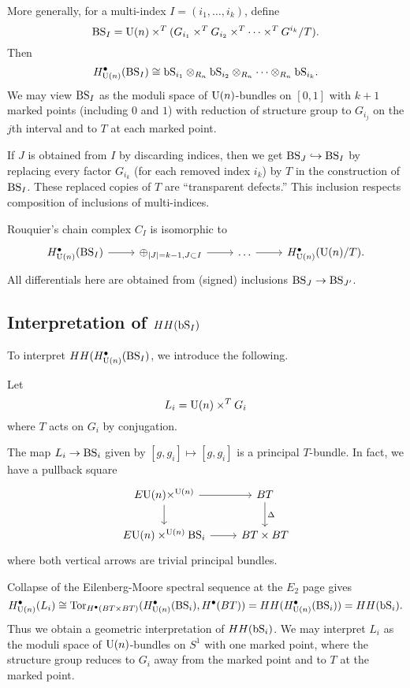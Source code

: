 More generally, for a multi-index $I = (i_1, \dots, i_k)$, define
\[
	\mathrm{BS}_I = \mathrm{U}(n) \times^T (G_{i_1} \times^T G_{i_2} \times^T \dots \times^T G^{i_k} / T).
\]
Then
\[
	H^\bullet_{\mathrm{U}(n)}(\mathrm{BS}_I) \cong \mathrm{bS}_{i_1} \otimes_{R_n} \mathrm{bS}_{i_2} \otimes_{R_n} \dots \otimes_{R_n} \mathrm{bS}_{i_k}.
\]
We may view $\mathrm{BS}_I$ as the moduli space of $\mathrm{U}(n)$-bundles on $[0, 1]$ with $k + 1$ marked points (including $0$ and $1$) with reduction of structure group to $G_{i_j}$ on the $j$th interval and to $T$ at each marked point.

If $J$ is obtained from $I$ by discarding indices, then we get $\mathrm{BS}_J \hookrightarrow \mathrm{BS}_I$ by replacing every factor $G_{i_k}$ (for each removed index $i_k$) by $T$ in the construction of $\mathrm{BS}_I$.
These replaced copies of $T$ are ``transparent defects.''
This inclusion respects composition of inclusions of multi-indices.

Rouquier's chain complex $C_I$ is isomorphic to
\[
	\begin{tikzcd}
		H^\bullet_{\U(n)}(\BS_I) \rar & \oplus_{\abs{J} = k-1, J \subset I} \rar & \dots \rar & H^\bullet_{\U(n)}(\U(n)/T).
	\end{tikzcd}
\]
All differentials here are obtained from (signed) inclusions $\mathrm{BS}_J \to \mathrm{BS}_{J'}$.

\subsection{Interpretation of $HH(\mathrm{bS}_I)$}

To interpret $HH(H^\bullet_{\mathrm{U}(n)}(\mathrm{BS}_I)$, we introduce the following.

\begin{dfn}
	Let
	\[
		L_i = \mathrm{U}(n) \times^T G_i
	\]
	where $T$ acts on $G_i$ by conjugation.
\end{dfn}

The map $L_i \to \mathrm{BS}_i$ given by $[g, g_i] \mapsto [g, g_i]$ is a principal $T$-bundle.
In fact, we have a pullback square
\[
	\begin{tikzcd}
		E\U(n) \times^{\U(n)} \rar \dar & BT \dar["\Delta"] \\
		E\U(n) \times^{\U(n)} \BS_i \rar & BT \times BT
	\end{tikzcd}
\]
where both vertical arrows are trivial principal bundles.

Collapse of the Eilenberg-Moore spectral sequence at the $E_2$ page gives
\[
	H^\bullet_{\mathrm{U}(n)}(L_i) \cong \operatorname{Tor}_{H^\bullet(BT \times BT)}(H^\bullet_{\mathrm{U}(n)}(\mathrm{BS}_i), H^\bullet(BT)) = HH(H^\bullet_{\mathrm{U}(n)}(\mathrm{BS}_i)) = HH(\mathrm{bS}_i).
\]
Thus we obtain a geometric interpretation of $HH(\mathrm{bS}_i)$.
We may interpret $L_i$ as the moduli space of $\mathrm{U}(n)$-bundles on $S^1$ with one marked point, where the structure group reduces to $G_i$ away from the marked point and to $T$ at the marked point.

